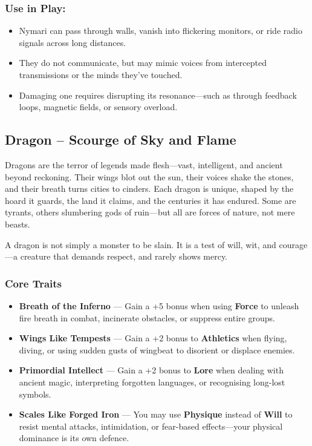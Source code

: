 \subsubsection*{Use in Play:}
\begin{itemize}\raggedright
  \item Nymari can pass through walls, vanish into flickering monitors, or ride radio signals across long distances.
  \item They do not communicate, but may mimic voices from intercepted transmissions or the minds they've touched.
  \item Damaging one requires disrupting its resonance—such as through feedback loops, magnetic fields, or sensory overload.
\end{itemize}


\subsection*{Dragon – Scourge of Sky and Flame}

Dragons are the terror of legends made flesh—vast, intelligent, and ancient beyond reckoning. Their wings blot out the sun, their voices shake the stones, and their breath turns cities to cinders. Each dragon is unique, shaped by the hoard it guards, the land it claims, and the centuries it has endured. Some are tyrants, others slumbering gods of ruin—but all are forces of nature, not mere beasts.

A dragon is not simply a monster to be slain. It is a test of will, wit, and courage—a creature that demands respect, and rarely shows mercy.

\subsubsection*{Core Traits}
\begin{itemize}
  \item \textbf{Breath of the Inferno} — Gain a +5 bonus when using \textbf{Force} to unleash fire breath in combat, incinerate obstacles, or suppress entire groups.

  \item \textbf{Wings Like Tempests} — Gain a +2 bonus to \textbf{Athletics} when flying, diving, or using sudden gusts of wingbeat to disorient or displace enemies.

  \item \textbf{Primordial Intellect} — Gain a +2 bonus to \textbf{Lore} when dealing with ancient magic, interpreting forgotten languages, or recognising long-lost symbols.

  \item \textbf{Scales Like Forged Iron} — You may use \textbf{Physique} instead of \textbf{Will} to resist mental attacks, intimidation, or fear-based effects—your physical dominance is its own defence.
\end{itemize}

